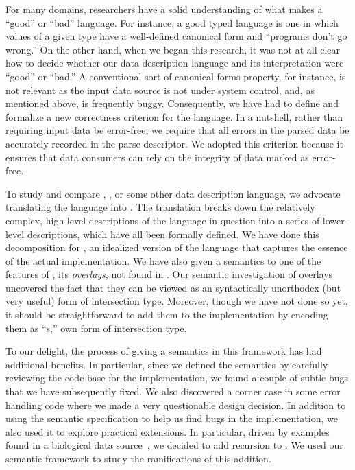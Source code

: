 For many domains, researchers have a solid understanding of
what makes a ``good'' or ``bad'' language.  For instance,
a good typed language is one in which values of a given type
have a well-defined canonical form and ``programs don't go wrong.''
On the other hand, when we began this research, it
was not at all clear
how to decide whether our data description language and
its interpretation were ``good'' or ``bad.''  A conventional sort
of canonical forms property, for instance, 
is not relevant as the input data source
is not under system control, and, as
mentioned above, is frequently buggy.  Consequently,
we have had to define and formalize a new correctness criterion for the language. 
In a nutshell, rather than requiring input data be error-free, we require
that all errors in the parsed data be accurately recorded
in the parse descriptor.  We adopted this criterion because it ensures
that data consumers can rely on the integrity of data marked as error-free.


To study and compare \pads{}, \datascript{}, or
some other data description language, we advocate translating
the language into \ddc{}.  The translation breaks down
the relatively complex, high-level descriptions of the language 
in question into a series of lower-level
\ddc{} descriptions, which have all been formally defined.  
We have done this decomposition for \ipads{}, an idealized version of the
\pads{} language that captures the essence of the actual 
implementation.  We have also given a semantics to one of the features
of \packettypes{}, its {\em overlays}, not found in \pads{}.
Our semantic investigation of overlays uncovered the fact that
they can be viewed as an syntactically 
unorthodcx (but very useful) form of intersection type.
Moreover, though we have not done so yet, it should be straightforward to
add them to the \pads{} implementation by encoding them as
``\Palternate{}s,'' \pads{} own form of intersection type.

To our delight, the process of giving \pads{} 
a semantics in this framework has had additional benefits.  
In particular, since we defined the
semantics by carefully reviewing the code base for the 
implementation, we found a couple of subtle bugs that we have subsequently fixed.  We also discovered a corner case in some error handling code
where we made a very questionable design decision.
In addition to using the semantic specification to help us find bugs
in the implementation, we also used it to explore practical extensions.
In particular, driven by examples found in a biological data 
source~\cite{geneontology}, we decided to add recursion to \pads{}.
We used our semantic framework to study the ramifications of this addition.


